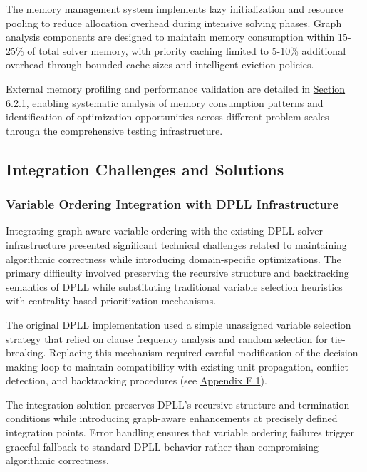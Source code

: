 The memory management system implements lazy initialization and resource pooling to reduce allocation overhead during intensive solving phases. Graph analysis components are designed to maintain memory consumption within 15-25\% of total solver memory, with priority caching limited to 5-10\% additional overhead through bounded cache sizes and intelligent eviction policies.

External memory profiling and performance validation are detailed in \hyperref[sec:timing-measurement]{Section 6.2.1}, enabling systematic analysis of memory consumption patterns and identification of optimization opportunities across different problem scales through the comprehensive testing infrastructure.

\subsection{Integration Challenges and Solutions}

\subsubsection{Variable Ordering Integration with DPLL Infrastructure}

Integrating graph-aware variable ordering with the existing DPLL solver infrastructure presented significant technical challenges related to maintaining algorithmic correctness while introducing domain-specific optimizations. The primary difficulty involved preserving the recursive structure and backtracking semantics of DPLL while substituting traditional variable selection heuristics with centrality-based prioritization mechanisms.

The original DPLL implementation used a simple unassigned variable selection strategy that relied on clause frequency analysis and random selection for tie-breaking. Replacing this mechanism required careful modification of the decision-making loop to maintain compatibility with existing unit propagation, conflict detection, and backtracking procedures (see \hyperref[appendix:variable-ordering-integration]{Appendix E.1}).

The integration solution preserves DPLL's recursive structure and termination conditions while introducing graph-aware enhancements at precisely defined integration points. Error handling ensures that variable ordering failures trigger graceful fallback to standard DPLL behavior rather than compromising algorithmic correctness.

